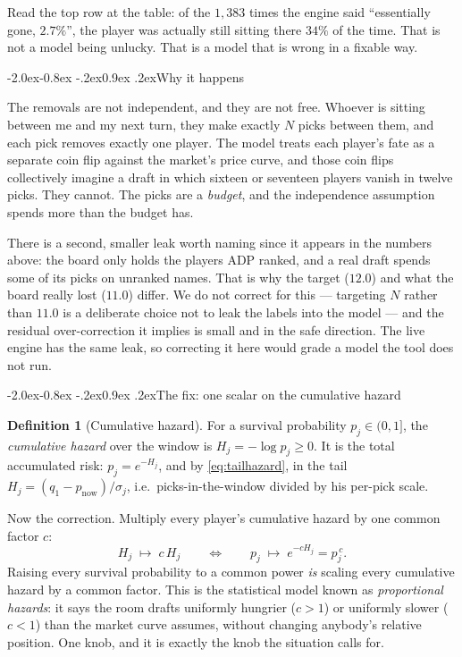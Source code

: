\documentclass[10pt,a4paper]{article}
\makeatletter
\theoremstyle{plain}
\theoremstyle{definition}
\newtheorem{definition}[theorem]{Definition}
\theoremstyle{remark}
\renewcommand\subsection{\@startsection{subsection}{2}{\z@}%
  {-2.0ex\@plus -0.8ex \@minus -.2ex}{0.9ex \@plus .2ex}{\normalfont\large\bfseries}}
\makeatother
\begin{document}
Read the top row at the table: of the $1{,}383$ times the engine said ``essentially
gone, $2.7\%$'', the player was actually still sitting there $34\%$ of the time. That is
not a model being unlucky. That is a model that is wrong in a fixable way.

\subsection{Why it happens}

The removals are not independent, and they are not free. Whoever is sitting between me
and my next turn, they make exactly $N$ picks between them, and each pick removes exactly
one player. The model treats each player's fate as a separate
coin flip against the market's price curve, and those coin flips collectively imagine a
draft in which sixteen or seventeen players vanish in twelve picks. They cannot. The
picks are a \emph{budget}, and the independence assumption spends more than the budget
has.

There is a second, smaller leak worth naming since it appears in the numbers above: the
board only holds the players ADP ranked, and a real draft spends some of its picks on
unranked names. That is why the target ($12.0$) and what the board really lost ($11.0$)
differ. We do not correct for this --- targeting $N$ rather than $11.0$ is a deliberate
choice not to leak the labels into the model --- and the residual over-correction it
implies is small and in the safe direction. The live engine has the same leak, so
correcting it here would grade a model the tool does not run.

\subsection{The fix: one scalar on the cumulative hazard}

\begin{definition}[Cumulative hazard]
For a survival probability $p_j \in (0,1]$, the \emph{cumulative hazard} over the window
is $H_j = -\log p_j \ge 0$. It is the total accumulated risk: $p_j = e^{-H_j}$, and
by \eqref{eq:tailhazard}, in the tail $H_j = (q_1 - p_{\text{now}})/\sigma_j$, i.e.\
picks-in-the-window divided by his per-pick scale.
\end{definition}

Now the correction. Multiply every player's cumulative hazard by one common factor $c$:
\[
H_j \;\longmapsto\; c\,H_j
\qquad\Longleftrightarrow\qquad
p_j \;\longmapsto\; e^{-cH_j} = p_j^{\,c}.
\]
Raising every survival probability to a common power \emph{is} scaling every cumulative
hazard by a common factor. This is the statistical model known as \emph{proportional
hazards}: it says the room drafts uniformly hungrier ($c > 1$) or uniformly slower
($c < 1$) than the market curve assumes, without changing anybody's relative position.
One knob, and it is exactly the knob the situation calls for.
\end{document}
